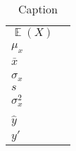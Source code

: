 \documentclass{article}
\DeclareMathOperator\E{\mathbb{E}}
\begin{document}
\begin{table}[]
    \centering
\begin{tabular}{ll}
    {\(\E(X)\)} & \\
    \(\mu_x\) & \\
    \(\bar{x}\) & \\
\hline\\
    \(\sigma_x\) & \\
    \(s\) & \\
     \(\sigma^2_x\) & \\
     
\hline\\
    \(\hat{y}\) & \\
    \({y'}\) & \\

      
      
    
\end{tabular}
\caption{Caption}
    \label{tab:my_label}
\end{table}
\end{document}
